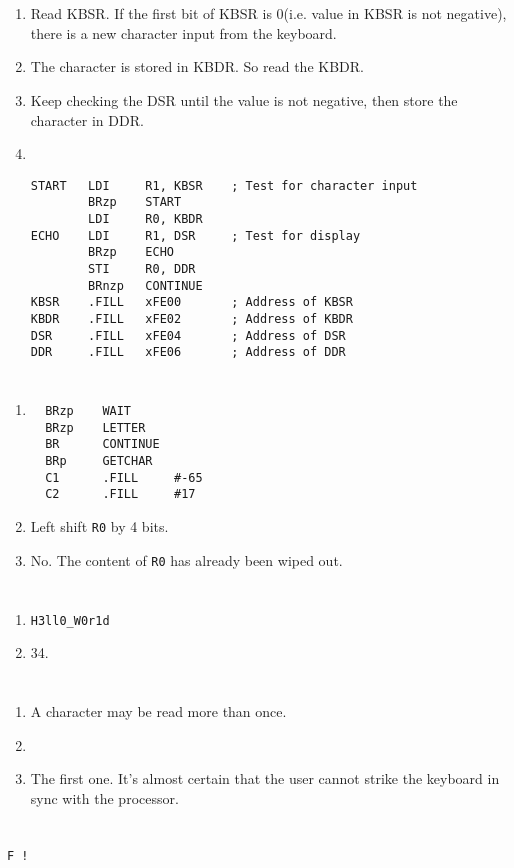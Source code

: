 \documentclass[UTF8]{ctexart}
\begin{document}
\section{}  %
\begin{enumerate}
  \item Read KBSR. If the first bit of KBSR is 0(i.e. value in KBSR is not negative), there is a new character input from the keyboard.
  \item The character is stored in KBDR. So read the KBDR.
  \item Keep checking the DSR until the value is not negative, then store the character in DDR.
  \item \ 
  
\begin{lstlisting}
START   LDI     R1, KBSR    ; Test for character input
        BRzp    START
        LDI     R0, KBDR
ECHO    LDI     R1, DSR     ; Test for display
        BRzp    ECHO
        STI     R0, DDR
        BRnzp   CONTINUE
KBSR    .FILL   xFE00       ; Address of KBSR
KBDR    .FILL   xFE02       ; Address of KBDR
DSR     .FILL   xFE04       ; Address of DSR
DDR     .FILL   xFE06       ; Address of DDR
\end{lstlisting}
\end{enumerate}

\section{}  %
\begin{enumerate}
  \item
\begin{lstlisting}
  BRzp    WAIT
  BRzp    LETTER
  BR      CONTINUE
  BRp     GETCHAR
  C1      .FILL     #-65
  C2      .FILL     #17
\end{lstlisting}
  \item Left shift \lstinline{R0} by 4 bits.
  \item No. The content of \lstinline{R0} has already been wiped out.
\end{enumerate}
\section{}  %
\begin{enumerate}
  \item \lstinline{H3ll0_W0r1d}
  \item 34.
\end{enumerate}

\section{}  %
\begin{enumerate}
  \item A character may be read more than once.
  \item 
  \item The first one. It's almost certain that the user cannot strike the keyboard in sync with the processor.
\end{enumerate}

\section{}  %
\lstinline{F !}

\section{}  %
\end{document}
